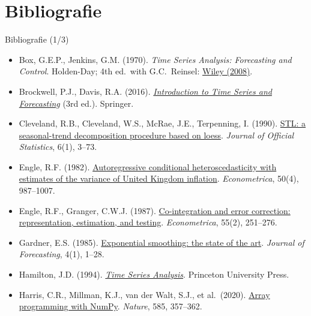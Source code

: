 \section{Bibliografie}

\begin{frame}{Bibliografie (1/3)}
\itemsize{\scriptsize}
\begin{itemize}
    \item Box, G.E.P., Jenkins, G.M. (1970). \emph{Time Series Analysis: Forecasting and Control}. Holden-Day; 4th ed.\ with G.C.\ Reinsel: \href{https://doi.org/10.1002/9781118619193}{Wiley (2008)}.
    \item Brockwell, P.J., Davis, R.A. (2016). \href{https://doi.org/10.1007/978-3-319-29854-2}{\emph{Introduction to Time Series and Forecasting}} (3rd ed.). Springer.
    \item Cleveland, R.B., Cleveland, W.S., McRae, J.E., Terpenning, I. (1990). \href{https://www.scb.se/contentassets/ca21efb41fee47d293bbee5bf7be7fb3/stl-a-seasonal-trend-decomposition-procedure-based-on-loess.pdf}{STL: a seasonal-trend decomposition procedure based on loess}. \emph{Journal of Official Statistics}, 6(1), 3--73.
    \item Engle, R.F. (1982). \href{https://doi.org/10.2307/1912773}{Autoregressive conditional heteroscedasticity with estimates of the variance of United Kingdom inflation}. \emph{Econometrica}, 50(4), 987--1007.
    \item Engle, R.F., Granger, C.W.J. (1987). \href{https://doi.org/10.2307/1913236}{Co-integration and error correction: representation, estimation, and testing}. \emph{Econometrica}, 55(2), 251--276.
    \item Gardner, E.S. (1985). \href{https://doi.org/10.1002/for.3980040103}{Exponential smoothing: the state of the art}. \emph{Journal of Forecasting}, 4(1), 1--28.
    \item Hamilton, J.D. (1994). \href{https://doi.org/10.2307/j.ctv14jx6sm}{\emph{Time Series Analysis}}. Princeton University Press.
    \item Harris, C.R., Millman, K.J., van der Walt, S.J., et al.\ (2020). \href{https://doi.org/10.1038/s41586-020-2649-2}{Array programming with NumPy}. \emph{Nature}, 585, 357--362.
\end{itemize}
\end{frame}

